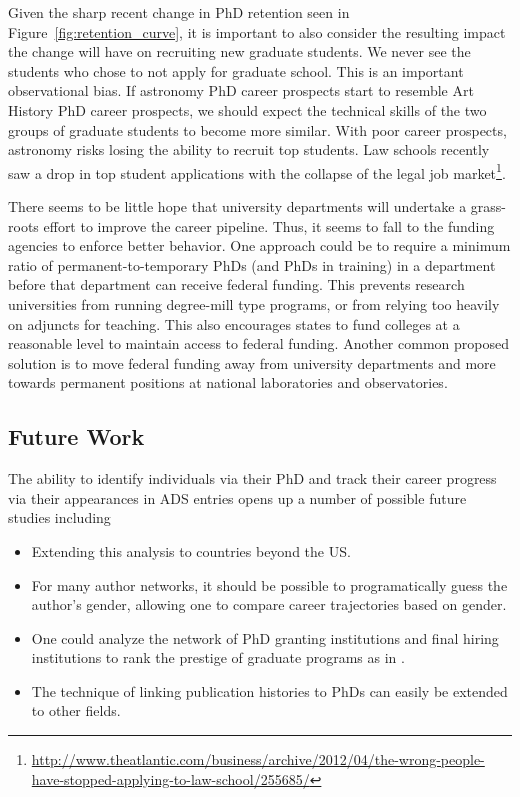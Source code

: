 \documentclass[preprint2]{aastex}
\begin{document}
Given the sharp recent change in PhD retention seen in Figure~\ref{fig:retention_curve}, it is important to also consider the resulting impact the change will have on recruiting new graduate students. We never see the students who chose to not apply for graduate school. This is an important observational bias.  If astronomy PhD career prospects start to resemble Art History PhD career prospects, we should expect the technical skills of the two groups of graduate students to become more similar.  With poor career prospects, astronomy risks losing the ability to recruit top students. Law schools recently saw a drop in top student applications with the collapse of the legal job market\footnote{\url{http://www.theatlantic.com/business/archive/2012/04/the-wrong-people-have-stopped-applying-to-law-school/255685/}}.  

There seems to be little hope that university departments will undertake a grass-roots effort to improve the career pipeline. Thus, it seems to fall to the funding agencies to enforce better behavior.  One approach could be to require a minimum ratio of permanent-to-temporary PhDs (and PhDs in training) in a department before that department can receive federal funding.  This prevents research universities from running degree-mill type programs, or from relying too heavily on adjuncts for teaching.  This also encourages states to fund colleges at a reasonable level to maintain access to federal funding.  Another common proposed solution is to move federal funding away from university departments and more towards permanent positions at national laboratories and observatories.


\subsection{Future Work}

The ability to identify individuals via their PhD and track their career progress via their appearances in ADS entries opens up a number of possible future studies including
\begin{itemize}
\item{Extending this analysis to countries beyond the US.}
\item{For many author networks, it should be possible to programatically guess the author's gender, allowing one to compare career trajectories based on gender.}
\item{One could analyze the network of PhD granting institutions and final hiring institutions to rank the prestige of graduate programs as in \citet{Clausete15}.}
\item{The technique of linking publication histories to PhDs can easily be extended to other fields.}
\end{itemize}
\end{document}
